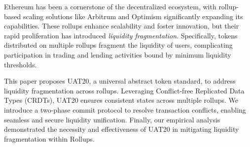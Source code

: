 Ethereum has been a cornerstone of the decentralized ecosystem, with rollup-based scaling solutions like Arbitrum and Optimism significantly expanding its capabilities. These rollups enhance scalability and foster innovation, but their rapid proliferation has introduced \emph{liquidity fragmentation}. Specifically, tokens distributed on multiple rollups fragment the liquidity of users, complicating participation in trading and lending activities bound by minimum liquidity thresholds.

This paper proposes UAT20, a universal abstract token standard, to address liquidity fragmentation across rollups. Leveraging Conflict-free Replicated Data Types (CRDTs), UAT20 ensures consistent states across multiple rollups. We introduce a two-phase commit protocol to resolve transaction conflicts, enabling seamless and secure liquidity unification. 
Finally, our empirical analysis demonstrated the necessity and effectiveness of UAT20 in mitigating liquidity fragmentation within Rollups.

